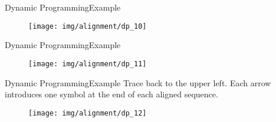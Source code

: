 \documentclass[10pt]{beamer}
\newcommand{\1}{
	\setbeamertemplate{background}{
		\texttt{[image: img/1]}
		\tikz[overlay] \fill[fill opacity=0.75,fill=white] (0,0) rectangle (-\paperwidth,\paperheight);
	}
}
\begin{document}
\begin{frame}{Dynamic Programming}{Example}	
	\begin{figure}[]
		\centering
		\texttt{[image: img/alignment/dp\_10]}
		\label{img:uniprot}
	\end{figure}	
	
\end{frame}

\begin{frame}{Dynamic Programming}{Example}	
	\begin{figure}[]
		\centering
		\texttt{[image: img/alignment/dp\_11]}
		\label{img:uniprot}
	\end{figure}	
	
\end{frame}


\begin{frame}{Dynamic Programming}{Example}	
	Trace back to the upper left. Each arrow introduces
	one symbol at the end of each aligned sequence.
	\begin{figure}[]
		\centering
		\texttt{[image: img/alignment/dp\_12]}
		\label{img:uniprot}
	\end{figure}	
	
\end{frame}
\end{document}

